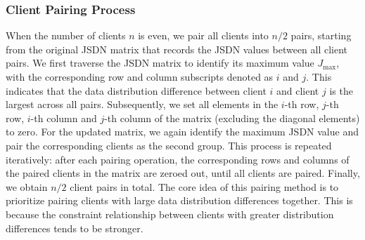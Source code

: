 \documentclass[journal,twoside,web]{ieeecolor}
\begin{document}
\subsubsection{Client Pairing Process}

When the number of clients $n$ is even, we pair all clients into $n/2$ pairs, starting from the original JSDN matrix that records the JSDN values between all client pairs. We first traverse the JSDN matrix to identify its maximum value $J_{\text{max}}$, with the corresponding row and column subscripts denoted as $i$ and $j$. This indicates that the data distribution difference between client $i$ and client $j$ is the largest across all pairs.
Subsequently, we set all elements in the $i$-th row, $j$-th row, $i$-th column and $j$-th column of the matrix (excluding the diagonal elements) to zero. For the updated matrix, we again identify the maximum JSDN value and pair the corresponding clients as the second group. This process is repeated iteratively: after each pairing operation, the corresponding rows and columns of the paired clients in the matrix are zeroed out, until all clients are paired. Finally, we obtain $n/2$ client pairs in total.
The core idea of this pairing method is to prioritize pairing clients with large data distribution differences together. This is because the constraint relationship between clients with greater distribution differences tends to be stronger.


\end{document}
